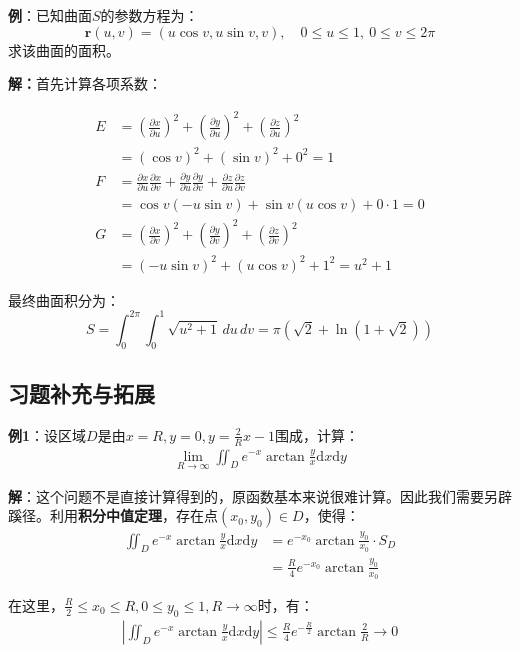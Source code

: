\documentclass{ctexart}
\let\oldtextbf\textbf
\renewcommand{\textbf}[1]{\textcolor{brown!50!red}{\oldtextbf{#1}}}
\begin{document}
\textbf{例}：已知曲面$S$的参数方程为：
\[
\mathbf{r}(u,v) = (u\cos v, u\sin v, v), \quad 0 \leq u \leq 1, \ 0 \leq v \leq 2\pi
\]
求该曲面的面积。

\textbf{解：}首先计算各项系数：

\begin{align*}
E &= \left(\frac{\partial x}{\partial u}\right)^2 + \left(\frac{\partial y}{\partial u}\right)^2 + \left(\frac{\partial z}{\partial u}\right)^2 \\
  &= (\cos v)^2 + (\sin v)^2 + 0^2 = 1 \\
F &= \frac{\partial x}{\partial u}\frac{\partial x}{\partial v} + \frac{\partial y}{\partial u}\frac{\partial y}{\partial v} + \frac{\partial z}{\partial u}\frac{\partial z}{\partial v} \\
  &= \cos v (-u\sin v) + \sin v (u\cos v) + 0 \cdot 1 = 0 \\
G &= \left(\frac{\partial x}{\partial v}\right)^2 + \left(\frac{\partial y}{\partial v}\right)^2 + \left(\frac{\partial z}{\partial v}\right)^2 \\
  &= (-u\sin v)^2 + (u\cos v)^2 + 1^2 = u^2 + 1
\end{align*}

最终曲面积分为：
\[
S = \int_0^{2\pi} \int_0^1 \sqrt{u^2 + 1}\,du\,dv= \pi \left(\sqrt{2} + \ln(1+\sqrt{2})\right)
\]


\subsection{习题补充与拓展}
\textbf{\color{brown!50!red}例1}：设区域$D$是由$x=R,y=0,y=\frac{2}{R}x-1$围成，计算：
\begin{align*}
     \lim_{R\to\infty} \iint_D e^{-x}\arctan{\frac{y}{x} }\mathrm{d}x\mathrm{d}y 
\end{align*}

\textbf{\color{brown!50!red}解}：这个问题不是直接计算得到的，原函数基本来说很难计算。因此我们需要另辟蹊径。利用\textbf{积分中值定理}，存在点$(x_0,y_0)\in D$，使得：
\begin{align*} 
   \iint_D e^{-x}\arctan{\frac{y}{x} }\mathrm{d}x\mathrm{d}y&=e^{-x_0}\arctan{\frac{y_0}{x_0} }
\cdot  S_D\\
&=\frac{R}{4}e^{-x_0}\arctan{\frac{y_0}{x_0} }
\end{align*}

在这里，$\frac{R}{2}\leq x_0\leq R,0\leq y_0\leq 1,R\to\infty$时，有：
\begin{align*} 
  \left| \iint_D e^{-x}\arctan{\frac{y}{x} }\mathrm{d}x\mathrm{d}y
\right|\leq \frac{R}{4}e^{-\frac{R}{2}}\arctan{\frac{2}{R}}\to0
\end{align*}
\end{document}
